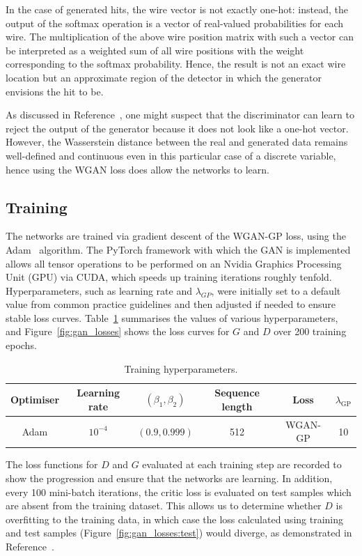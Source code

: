 In the case of generated hits, the wire vector is not exactly one-hot: instead,
the output of the softmax operation is a vector of real-valued probabilities for
each wire. The multiplication of the above wire position matrix with such a
vector can be interpreted as a weighted sum of all wire positions with the
weight corresponding to the softmax probability. Hence, the result is not an
exact wire location but an approximate region of the detector in which the
generator envisions the hit to be.

As discussed in Reference~\cite{NIPS2017_892c3b1c}, one might suspect that the
discriminator can learn to reject the output of the generator because it does
not look like a one-hot vector. However, the Wasserstein distance between the
real and generated data remains well-defined and continuous even in this
particular case of a discrete variable, hence using the WGAN loss does allow the
networks to learn.


\subsection{Training}
The networks are trained via gradient descent of the WGAN-GP loss, using the
Adam~\cite{Kingma2015AdamAM} algorithm. The PyTorch framework with which the GAN
is implemented allows all tensor operations to be performed on an Nvidia Graphics
Processing Unit (GPU) via CUDA, which speeds up training iterations roughly
tenfold. Hyperparameters, such as learning rate and $\lambda_{GP}$, were
initially set to a default value from common practice guidelines and then
adjusted if needed to ensure stable loss curves.
Table~\ref{tab:training_hyperparameters} summarises the values of various
hyperparameters, and Figure~\ref{fig:gan_losses} shows the loss curves for $G$
and $D$ over 200 training epochs.

\begin{table}[]
    \centering
    \begin{tabular}{cccccc}
        \toprule
        Optimiser & Learning rate & $(\beta_1, \beta_2)$ & Sequence length & Loss &
        $\lambda_\mathrm{GP}$
        \\\midrule 
        Adam & $10^{-4}$ & $(0.9, 0.999)$ & 512 & WGAN-GP & 10
        \\\bottomrule
    \end{tabular}
    \caption{Training hyperparameters.}
    \label{tab:training_hyperparameters}
\end{table}

The loss functions for $D$ and $G$ evaluated at each training step are recorded
to show the progression and ensure that the networks are learning. In addition,
every 100 mini-batch iterations, the critic loss is evaluated on test samples
which are absent from the training dataset. This allows us to determine whether
$D$ is overfitting to the training data, in which case the loss calculated using
training and test samples (Figure~\ref{fig:gan_losses:test}) would diverge, as
demonstrated in Reference~\cite{NIPS2017_892c3b1c}.


